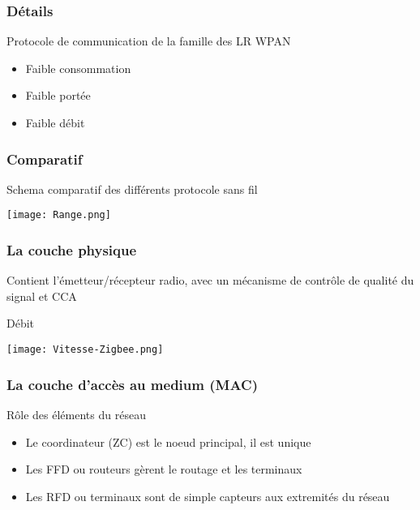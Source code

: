 \documentclass{beamer}
\begin{document}
  \begin{frame}
    \frametitle{Détails}
    Protocole de communication de la famille des LR WPAN
    \begin{itemize}
      \item Faible consommation
      \item Faible portée
      \item Faible débit
    \end{itemize}
  \end{frame}

  \begin{frame}
    \frametitle{Comparatif}
    \begin{block}{Schema comparatif des différents protocole sans fil}
      \begin{center}
       \texttt{[image: Range.png]}
      \end{center} 
    \end{block}
  \end{frame}
  
  \begin{frame}
    \frametitle{La couche physique}
    Contient l'émetteur/récepteur radio, avec un mécanisme de contrôle de qualité du signal et CCA
    \begin{block}{Débit}
      \begin{center}
       \texttt{[image: Vitesse-Zigbee.png]}
      \end{center}
    \end{block}
  \end{frame}
  
  \begin{frame}
    \frametitle{La couche d'accès au medium (MAC)}
    \begin{block}{Rôle des éléments du réseau}
      \begin{itemize}
        \item Le coordinateur (ZC) est le noeud principal, il est unique
        \item Les FFD ou routeurs gèrent le routage et les terminaux
        \item Les RFD ou terminaux sont de simple capteurs aux extremités du réseau
      \end{itemize}
    \end{block}
  \end{frame}
  
\end{document}
